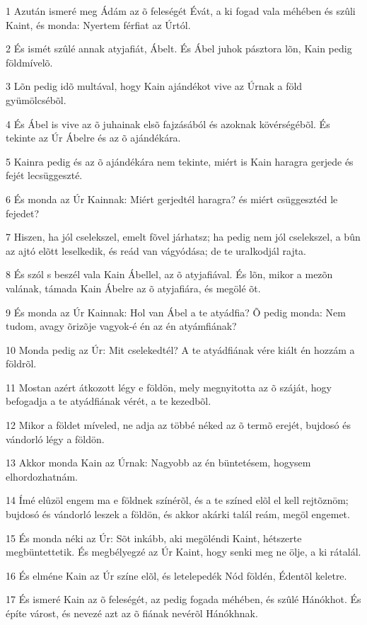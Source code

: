 \par 1 Azután ismeré meg Ádám az õ feleségét Évát, a ki fogad vala méhében és szûli Kaint, és monda: Nyertem férfiat az Úrtól.
\par 2 És ismét szûlé annak atyjafiát, Ábelt. És Ábel juhok pásztora lõn, Kain pedig földmívelõ.
\par 3 Lõn pedig idõ multával, hogy Kain ajándékot vive az Úrnak a föld gyümölcsébõl.
\par 4 És Ábel is vive az õ juhainak elsõ fajzásából és azoknak kövérségébõl. És tekinte az Úr Ábelre és az õ ajándékára.
\par 5 Kainra pedig és az õ ajándékára nem tekinte, miért is Kain haragra gerjede és fejét lecsüggeszté.
\par 6 És monda az Úr Kainnak: Miért gerjedtél haragra? és miért csüggesztéd le fejedet?
\par 7 Hiszen, ha jól cselekszel, emelt fõvel járhatsz; ha pedig nem jól cselekszel, a bûn az ajtó elõtt leselkedik, és reád van vágyódása; de te uralkodjál rajta.
\par 8 És szól s beszél vala Kain Ábellel, az õ atyjafiával. És lõn, mikor a mezõn valának, támada Kain Ábelre az õ atyjafiára, és megölé õt.
\par 9 És monda az Úr Kainnak: Hol van Ábel a te atyádfia? Õ pedig monda: Nem tudom, avagy õrizõje vagyok-é én az én atyámfiának?
\par 10 Monda pedig az Úr: Mit cselekedtél? A te atyádfiának vére kiált én hozzám a földrõl.
\par 11 Mostan azért átkozott légy e földön, mely megnyitotta az õ száját, hogy befogadja a te atyádfiának vérét, a te kezedbõl.
\par 12 Mikor a földet míveled, ne adja az többé néked az õ termõ erejét, bujdosó és vándorló légy a földön.
\par 13 Akkor monda Kain az Úrnak: Nagyobb az én büntetésem, hogysem elhordozhatnám.
\par 14 Ímé elûzöl engem ma e földnek színérõl, és a te színed elõl el kell rejtõznöm; bujdosó és vándorló leszek a földön, és akkor akárki talál reám, megöl engemet.
\par 15 És monda néki az Úr: Sõt inkább, aki megöléndi Kaint, hétszerte megbüntettetik. És megbélyegzé az Úr Kaint, hogy senki meg ne ölje, a ki rátalál.
\par 16 És elméne Kain az Úr színe elõl, és letelepedék Nód földén, Édentõl keletre.
\par 17 És ismeré Kain az õ feleségét, az pedig fogada méhében, és szûlé Hánókhot. És építe várost, és nevezé azt az õ fiának nevérõl Hánókhnak.

